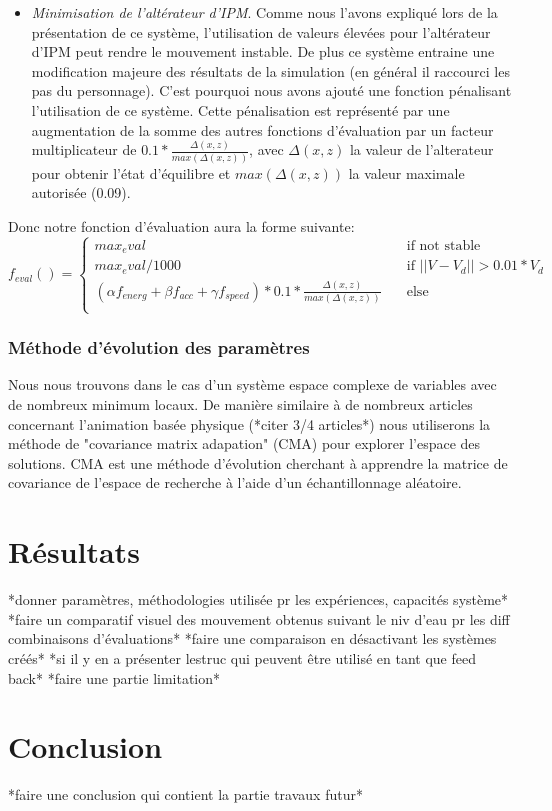 \documentclass{llncs}
\begin{document}
\begin{itemize}
\item{\textit{Minimisation de l'altérateur d'IPM}. Comme nous l'avons expliqué lors de la présentation de ce système, l'utilisation de valeurs élevées pour l'altérateur d'IPM peut rendre le mouvement instable. De plus ce système entraine une modification majeure des résultats de la simulation (en général il raccourci les pas du personnage). C'est pourquoi nous avons ajouté une fonction pénalisant l'utilisation de ce système. Cette pénalisation est représenté par une augmentation de la somme des autres fonctions d'évaluation par un facteur multiplicateur de $0.1*\frac{\Delta(x,z)}{max(\Delta(x,z))}$, avec $\Delta(x,z)$ la valeur de l'alterateur pour obtenir l'état d'équilibre et $max(\Delta(x,z))$ la valeur maximale autorisée (0.09).}
\end{itemize}

Donc notre fonction d'évaluation aura la forme suivante:
$$
f_{eval}() =
  \begin{cases}
    max_eval       & \quad \text{if not stable} \\
    max_eval/1000       & \quad \text{if } ||V-V_d||>0.01*V_d \\
   (\alpha f_{energ} + \beta f_{acc} + \gamma f_{speed})*0.1*\frac{\Delta(x,z)}{max(\Delta(x,z))} & \quad \text{else}\\
  \end{cases}
$$
%
\subsubsection{Méthode d'évolution des paramètres}
Nous nous trouvons dans le cas d'un système espace complexe de variables avec de nombreux minimum locaux. De manière similaire à de nombreux articles concernant l'animation basée physique (*citer 3/4 articles*) nous utiliserons la méthode de "covariance matrix adapation" (CMA) \cite{hansen2006cma} pour explorer l'espace des solutions. CMA est une méthode d'évolution cherchant à apprendre la matrice de covariance de l'espace de recherche à l'aide d'un échantillonnage aléatoire.




%
\section{Résultats}
%
*donner paramètres, méthodologies utilisée pr les expériences, capacités système*
*faire un comparatif visuel des mouvement obtenus suivant le niv d'eau pr les diff combinaisons d'évaluations*
*faire une comparaison en désactivant les systèmes créés*
*si il y en a présenter lestruc qui peuvent être utilisé en tant que feed back*
*faire une partie limitation*

\section{Conclusion}
%
*faire une conclusion qui contient la partie travaux futur*
%


%
\nocite{*}


%
\end{document}
